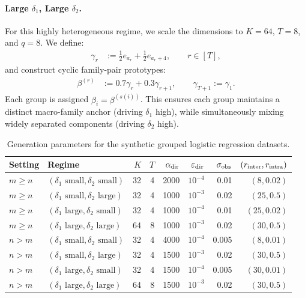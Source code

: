 \documentclass{article}
\newcommand{\eqdef}{:=}
\theoremstyle{plain}
\begin{document}
\paragraph{Large $\delta_1$, Large $\delta_2$.}
For this highly heterogeneous regime, we scale the dimensions to $K=64$, $T=8$, and $q=8$. We define:
\begin{align*}
    \gamma_r
    &\eqdef
    \frac12 e_{a_r}+\frac12 e_{a_r+4},
    \qquad r\in[T],
\end{align*}
and construct cyclic family-pair prototypes:
\begin{align*}
    \beta^{(r)}
    &\eqdef
    0.7\gamma_r + 0.3\gamma_{r+1},
    \qquad \gamma_{T+1}\eqdef \gamma_1.
\end{align*}
Each group is assigned $\beta_i=\beta^{(s(i))}$. This ensures each group maintains a distinct macro-family anchor (driving $\delta_1$ high), while simultaneously mixing widely separated components (driving $\delta_2$ high).

\begin{table}[t]
    \centering
    \small
    \setlength{\tabcolsep}{4pt}
    \begin{tabular}{llrrrrrr}
        \toprule
        \textbf{Setting} & \textbf{Regime} & $K$ & $T$ & $\alpha_{\rm dir}$ & $\varepsilon_{\rm dir}$ & $\sigma_{\rm obs}$ & $(r_{\rm inter},r_{\rm intra})$ \\
        \midrule
        $m\ge n$ & $(\delta_1 \text{ small}, \delta_2 \text{ small})$ & 32 & 4 & 2000 & $10^{-4}$ & 0.01 & $(8,0.02)$ \\
        $m\ge n$ & $(\delta_1 \text{ small}, \delta_2 \text{ large})$ & 32 & 4 & 1000 & $10^{-3}$ & 0.02 & $(25,0.5)$ \\
        $m\ge n$ & $(\delta_1 \text{ large}, \delta_2 \text{ small})$ & 32 & 4 & 1000 & $10^{-4}$ & 0.01 & $(25,0.02)$ \\
        $m\ge n$ & $(\delta_1 \text{ large}, \delta_2 \text{ large})$ & 64 & 8 & 1000 & $10^{-3}$ & 0.02 & $(30,0.5)$ \\
        \midrule
        $n>m$ & $(\delta_1 \text{ small}, \delta_2 \text{ small})$ & 32 & 4 & 4000 & $10^{-4}$ & 0.005 & $(8,0.01)$ \\
        $n>m$ & $(\delta_1 \text{ small}, \delta_2 \text{ large})$ & 32 & 4 & 1500 & $10^{-3}$ & 0.02 & $(30,0.5)$ \\
        $n>m$ & $(\delta_1 \text{ large}, \delta_2 \text{ small})$ & 32 & 4 & 1500 & $10^{-4}$ & 0.005 & $(30,0.01)$ \\
        $n>m$ & $(\delta_1 \text{ large}, \delta_2 \text{ large})$ & 64 & 8 & 1500 & $10^{-3}$ & 0.02 & $(30,0.5)$ \\
        \bottomrule
    \end{tabular}
    \caption{Generation parameters for the synthetic grouped logistic regression datasets.}
    \label{tab:synthetic-generation-params}
\end{table}
\end{document}

